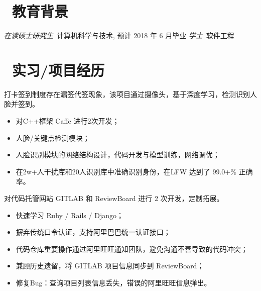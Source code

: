 \documentclass{resume}
\begin{document}


 
\section{\faGraduationCap\  教育背景}
\textit{在读硕士研究生}\ 计算机科学与技术, 预计 2018 年 6 月毕业
\textit{学士}\ 软件工程

\section{\faUsers\ 实习/项目经历}

\begin{onehalfspacing}
打卡签到制度存在漏签代签现象，该项目通过摄像头，基于深度学习，检测识别人脸并签到。
\begin{itemize}
  \item 对C++框架 Caffe 进行2次开发；
  \item 人脸/关键点检测模块；
  \item 人脸识别模块的网络结构设计，代码开发与模型训练，网络调优；
  \item 在2w+人干扰库和20人识别库中准确识别身份，在LFW 达到了 99.0+\% 正确率。
\end{itemize}
\end{onehalfspacing}

对代码托管网站 GITLAB 和 ReviewBoard 进行 2 次开发，定制拓展。
\begin{onehalfspacing}
\begin{itemize}
  \item 快速学习 Ruby / Rails / Django；
  \item 摒弃传统口令认证，支持阿里巴巴统一认证接口；
  \item 代码仓库重要操作通过阿里旺旺通知团队，避免沟通不善导致的代码冲突；
  \item 兼顾历史遗留，将 GITLAB 项目信息同步到 ReviewBoard；
  \item 修复Bug：查询项目列表信息丢失，错误的阿里旺旺信息弹出。
\end{itemize}
\end{onehalfspacing}
\end{document}
